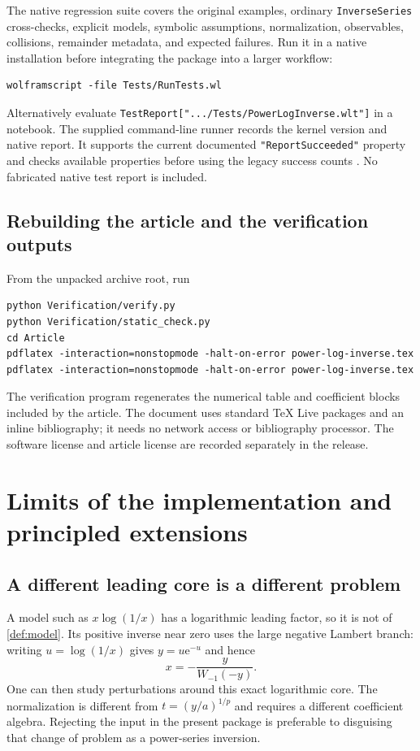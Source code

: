 \documentclass[11pt,a4paper]{article}
\theoremstyle{definition}
\theoremstyle{remark}
\newcommand{\ee}{\mathrm e}
\newcommand{\code}[1]{\texttt{#1}}
\begin{document}
The native regression suite covers the original examples, ordinary
\code{InverseSeries} cross-checks, explicit models, symbolic assumptions,
normalization, observables, collisions, remainder metadata, and expected
failures. Run it in a native installation before integrating the package into
a larger workflow:
\begin{lstlisting}[language={}]
wolframscript -file Tests/RunTests.wl
\end{lstlisting}
Alternatively evaluate \code{TestReport[".../Tests/PowerLogInverse.wlt"]} in a
notebook. The supplied command-line runner records the kernel version and
native report. It supports the current documented
\code{"ReportSucceeded"} property and checks available properties before
using the legacy success counts \cite{testreport,testreportobject,verificationtest}.
No fabricated native test report is included.

\subsection{Rebuilding the article and the verification outputs}

From the unpacked archive root, run
\begin{lstlisting}[language={}]
python Verification/verify.py
python Verification/static_check.py
cd Article
pdflatex -interaction=nonstopmode -halt-on-error power-log-inverse.tex
pdflatex -interaction=nonstopmode -halt-on-error power-log-inverse.tex
\end{lstlisting}
The verification program regenerates the numerical table and coefficient
blocks included by the article. The document uses standard TeX Live packages
and an inline bibliography; it needs no network access or bibliography
processor. The software license and article license are recorded separately
in the release.

\section{Limits of the implementation and principled extensions}
\label{sec:limits}

\subsection{A different leading core is a different problem}

A model such as $x\log(1/x)$ has a logarithmic leading factor, so it is not of
\cref{def:model}. Its positive inverse near zero uses the large negative
Lambert branch: writing $u=\log(1/x)$ gives $y=u\ee^{-u}$ and hence
\[
 x=-\frac{y}{W_{-1}(-y)}.
\]
One can then study perturbations around this exact logarithmic core. The
normalization is different from $t=(y/a)^{1/p}$ and requires a different
coefficient algebra. Rejecting the input in the present package is preferable
to disguising that change of problem as a power-series inversion.
\end{document}
